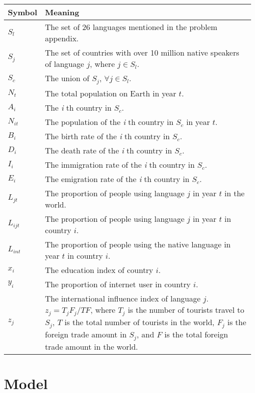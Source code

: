 \documentclass{mcmthesis}
\begin{document}
\begin{tabularx}{\textwidth}{l|X}
\hline
  \textbf{Symbol} & \textbf{Meaning} \\
\hline
    $S_l$ & The set of 26 languages mentioned in the problem appendix.\\ \hline
    $S_j$ & The set of countries with over 10 million native speakers of language $j$, where $j \in S_l$.\\ \hline
    $S_c$ & The union of $S_j$, $\forall j \in S_l$.\\ \hline
    $N_t$ & The total population on Earth in year $t$.\\ \hline
    $A_i$ & The \textit{i} th country in $S_c$.\\ \hline
    $N_{it}$ & The population of the \textit{i} th country in $S_c$ in year $t$.\\ \hline
    $B_i$ & The birth rate of the \textit{i} th country in $S_c$.\\ \hline
    $D_i$ & The death rate of the \textit{i} th country in $S_c$.\\ \hline
    $I_i$ & The immigration rate of the \textit{i} th country in $S_c$.\\ \hline
    $E_i$ & The emigration rate of the \textit{i} th country in $S_c$.\\ \hline
    $L_{jt}$ & The proportion of people using language $j$ in year $t$ in the world.\\ \hline
    $L_{ijt}$ & The proportion of people using language $j$ in year $t$ in country $i$.\\ \hline
    $L_{int}$ & The proportion of people using the native language in year $t$ in country $i$.\\ \hline
    $x_i$ & The education index\cite{wiki:edu} of country $i$.\\ \hline
    $y_i$ & The proportion of internet user in country $i$.\\ \hline
    $z_j$ & The international influence index of language $j$. $z_j=T_j F_j/TF$, where $T_j$ is the number of tourists travel to $S_j$, $T$ is the total number of tourists in the world, $F_j$ is the foreign trade amount in $S_j$, and $F$ is the total foreign trade amount in the world.\\ \hline

\end{tabularx}


\section{Model}
\end{document}

